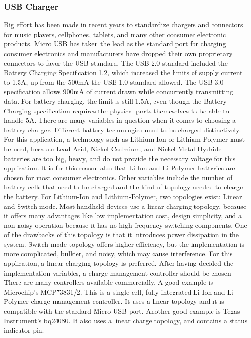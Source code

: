 \subsubsection{USB Charger}
Big effort has been made in recent years to standardize chargers and connectors for music players, cellphones, tablets, and many other consumer electronic products. Micro USB has taken the lead as the standard port for charging consumer electronics and manufacturers have dropped their own proprietary connectors to favor the USB standard.
The USB 2.0 standard included the Battery Charging Specification 1.2, which increased the limits of supply current to 1.5A, up from the 500mA the USB 1.0 standard allowed. The USB 3.0 specification allows 900mA of current drawn while concurrently transmitting data. For battery charging, the limit is still 1.5A, even though the Battery Charging specification requires the physical ports themeselves to be able to handle 5A.
There are many variables in question when it comes to choosing a battery charger. Different battery technologies need to be charged distinctively. For this application, a technology such as Lithium-Ion or Lithium-Polymer must be used, because Lead-Acid, Nickel-Cadmium, and Nickel-Metal-Hydride batteries are too big, heavy, and do not provide the necessary voltage for this application. It is for this reason also that Li-Ion and Li-Polymer batteries are chosen for most consumer electronics.
Other variables include the number of battery cells that need to be charged and the kind of topology needed to charge the battery. For Lithium-Ion and Lithium-Polymer, two topologies exist: Linear and Switch-mode.
Most handheld devices use a linear charging topology, because it offers many advantages like low implementation cost, design simplicity, and a non-noisy operation because it has no high frequency switching components. One of the drawbacks of this topology is that it introduces power dissipation in the system. Switch-mode topology offers higher efficiency, but the implementation is more complicated, bulkier, and noisy, which may cause interference. For this application, a linear charging topology is preferred.
After having decided the implementation variables, a charge management controller should be chosen. There are many controllers available commercially. A good example is Microchip's MCP73831/2. This is a single cell, fully integrated Li-Ion and Li-Polymer charge management controller. It uses a linear topology and it is compatible with the stardard Micro USB port. 
Another good example is Texas Instrument's bq24080. It also uses a linear charge topology, and contains a status indicator pin.
